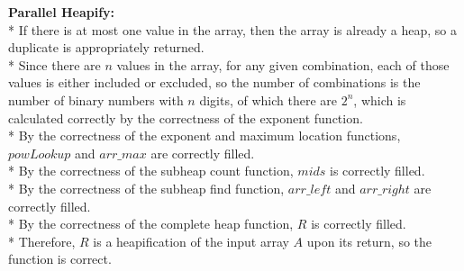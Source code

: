 \documentclass[letterpaper, reqno, 11pt]{article}
\begin{document}
\begin{description}
	\item{\bf Parallel Heapify:}\\*
	If there is at most one value in the array, then the array is already a heap,
	so a duplicate is appropriately returned.\\*
	Since there are $n$ values in the array, for any given combination, each of those values
	is either included or excluded, so the number of combinations is the number of binary
	numbers with $n$ digits, of which there are $2^n$, which is calculated correctly by the
	correctness of the exponent function.\\*
	By the correctness of the exponent and maximum location functions, $powLookup$ and $arr\_max$
	are correctly filled.\\*
	By the correctness of the subheap count function, $mids$ is correctly filled.\\*
	By the correctness of the subheap find function, $arr\_left$ and $arr\_right$ are correctly filled.\\*
	By the correctness of the complete heap function, $R$ is correctly filled.\\*
	Therefore, $R$ is a heapification of the input array $A$ upon its return, so the function is correct.

\end{description}
\end{document}
